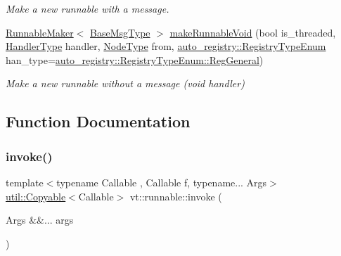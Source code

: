 \begin{DoxyCompactItemize}
\begin{DoxyCompactList}\small\item\em Make a new runnable with a message. \end{DoxyCompactList}\item 
\hyperlink{structvt_1_1runnable_1_1_runnable_maker}{Runnable\+Maker}$<$ \hyperlink{namespacevt_a44d0d4e144748f2b19a1cfd962f50338}{Base\+Msg\+Type} $>$ \hyperlink{namespacevt_1_1runnable_afe96cb5c83e403cb2c0a75b4a78fb007}{make\+Runnable\+Void} (bool is\+\_\+threaded, \hyperlink{namespacevt_af64846b57dfcaf104da3ef6967917573}{Handler\+Type} handler, \hyperlink{namespacevt_a866da9d0efc19c0a1ce79e9e492f47e2}{Node\+Type} from, \hyperlink{namespacevt_1_1auto__registry_a9f369ca2b484130b396729e2ddf05241}{auto\+\_\+registry\+::\+Registry\+Type\+Enum} han\+\_\+type=\hyperlink{namespacevt_1_1auto__registry_a9f369ca2b484130b396729e2ddf05241aed767d8e868d24805af30efeb716d412}{auto\+\_\+registry\+::\+Registry\+Type\+Enum\+::\+Reg\+General})
\begin{DoxyCompactList}\small\item\em Make a new runnable without a message (void handler) \end{DoxyCompactList}\end{DoxyCompactItemize}


\subsection{Function Documentation}
\mbox{\label{namespacevt_1_1runnable_a14fa3dbf3bef4a683fc7284452b766d3}} 
\subsubsection{\texorpdfstring{invoke()}{invoke()}\hspace{0.1cm}{\footnotesize\ttfamily [1/3]}}
{\footnotesize\ttfamily template$<$typename Callable , Callable f, typename... Args$>$ \\
\hyperlink{namespacevt_1_1util_ae9a553985cdc8e9bd4e55f55161f2929}{util\+::\+Copyable}$<$Callable$>$ vt\+::runnable\+::invoke (\begin{DoxyParamCaption}\item[{Args \&\&...}]{args }\end{DoxyParamCaption})}

\mbox{\label{namespacevt_1_1runnable_aa86b7892ea9590c2e8fef9ed0ca4e80c}} 
